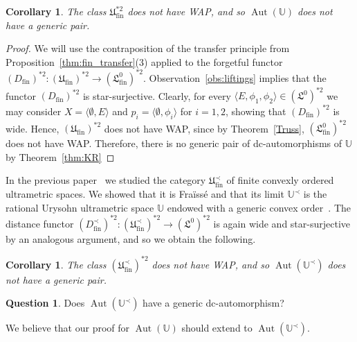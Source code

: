 \documentclass[10pt,a4paper]{article}
\newtheorem{wn}[tw]{Corollary}
\theoremstyle{definition}
\newtheorem{question}[tw]{Question}
\theoremstyle{remark}
\newcommand \seq [1]{\langle #1 \rangle}
\newcommand \maps {\colon} %
\newcommand \U {\mathbb{U}}
\newcommand \fin {{\operatorname{fin}}}
\newcommand \Lin {\mathfrak{L}}
\newcommand \Ult {\mathfrak{U}}
\newcommand \UltConv {\Ult^\prec}
\newcommand \Aut {\operatorname{Aut}}
\let \aut \Aut
\begin{document}
\begin{wn} \label{cor:no_generic_pair}
    The class $\Ult_\fin^{*2}$ does not have WAP, and so $\aut(\U)$ does not have a generic pair.
\end{wn}
\begin{proof}
    We will use the contraposition of the transfer principle from Proposition~\ref{thm:fin_transfer}(3) applied to the forgetful functor $(D_\fin)^{*2}\maps (\Ult_\fin)^{*2} \to (\Lin^0_\fin)^{*2}$.
    Observation~\ref{obs:liftings} implies that the functor $(D_\fin)^{*2}$ is star-surjective.
    Clearly, for every $\seq{E, \phi_1, \phi_2} \in (\Lin^0)^{*2}$ we may consider $X = \seq{\emptyset, E}$ and $p_i = \seq{\emptyset, \phi_i}$ for $i = 1, 2$, showing that $(D_\fin)^{*2}$ is wide.
    Hence, $(\Ult_\fin)^{*2}$ does not have WAP, since by Theorem~\ref{Truss}, $(\Lin^0_\fin)^{*2}$ does not have WAP.
    Therefore, there is no generic pair of dc-automorphisms of $\U$ by Theorem~\ref{thm:KR}
\end{proof}

In the previous paper~\cite[Section~3.3]{paper1} we studied the category $\UltConv_\fin$ of finite convexly ordered ultrametric spaces.
We showed that it is Fraïssé and that its limit $\U^\prec$ is the rational Urysohn ultrametric space $\U$ endowed with a generic convex order~\cite[Theorem~3.16]{paper1}.
The distance functor $(D^\prec_\fin)^{*2}\maps (\UltConv_\fin)^{*2} \to (\Lin^0)^{*2}$ is again wide and star-surjective by an analogous argument, and so we obtain the following.

\begin{wn} \label{cor:no_generic_pair_convex}
    The class $(\UltConv_\fin)^{*2}$ does not have WAP, and so $\aut(\U^\prec)$ does not have a generic pair.
\end{wn}

\begin{question} \label{que:generic_auto_convex}
Does  $\Aut(\U^\prec)$ have a generic dc-automorphism?
\end{question}

We believe that our proof for $\Aut(\U)$  should extend to $\Aut(\U^\prec)$.
\end{document}
